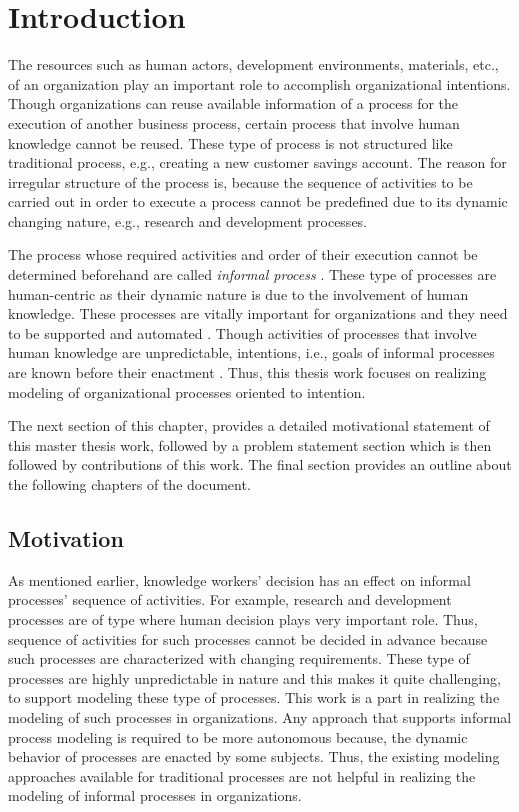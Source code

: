 \chapter{Introduction}
\label{chap:introduction}

The resources such as human actors, development environments, materials, etc., of an organization play an important role to accomplish organizational intentions. Though organizations can reuse available information of a process for the execution of another business process, certain process that involve human knowledge cannot be reused. These type of process is not structured like traditional process, e.g., creating a new customer savings account. The reason for irregular structure of the process is, because the sequence of activities to be carried out in order to execute a process cannot be predefined due to its dynamic changing nature, e.g., research and development processes.

The process whose required activities and order of their execution cannot be determined beforehand are called \textit{informal process} \cite{Sungur2014}. These type of processes are human-centric as their dynamic nature is due to the involvement of human knowledge. These processes are vitally important for organizations and they need to be supported and automated \cite{Sungur2014a}. Though activities of processes that involve human knowledge are unpredictable, intentions, i.e., goals of informal processes are known before their enactment \cite{DiCiccio2015}. Thus, this thesis work focuses on realizing modeling of organizational processes oriented to intention. 

The next section of this chapter, provides a detailed motivational statement of this master thesis work, followed by a problem statement section which is then followed by contributions of this work. The final section provides an outline about the following chapters of the document. 

\section{Motivation}
\label{sec:motivation}
As mentioned earlier, knowledge workers' decision has an effect on informal processes' sequence of activities. For example, research and development processes are of type where human decision plays very important role. Thus, sequence of activities for such processes cannot be decided in advance because such processes are characterized with changing requirements. These type of processes are highly unpredictable in nature and this makes it quite challenging, to support modeling these type of processes. This work is a part in realizing the modeling of such processes in organizations. Any approach that supports informal process modeling is required to be more autonomous because, the dynamic behavior of processes are enacted by some subjects. Thus, the existing modeling approaches available for traditional processes are not helpful in realizing the modeling of informal processes in organizations.  

